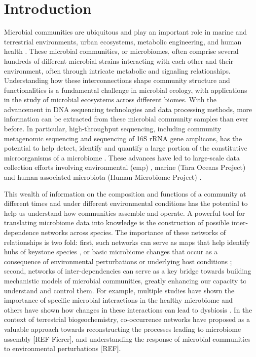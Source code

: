 
\section*{Introduction}

  Microbial communities are ubiquitous and play an important role in marine and terrestrial environments, urban ecosystems, metabolic engineering, and human health \cite{Ghoul2016,Thompson2017}.
  These microbial communities, or microbiomes, often comprise several hundreds of different microbial strains interacting with each other and their environment, often through intricate metabolic and signaling relationships.
  Understanding how these interconnections shape community structure and functionalities is a fundamental challenge in microbial ecology, with applications in the study of microbial ecosystems across different biomes. 
  With the advancement in DNA sequencing technologies \cite{Narihiro2017} and data processing methods,  more information can be extracted from these microbial community samples than ever before.
  In particular, high-throughput sequencing, including community metagenomic sequencing and sequencing of 16S rRNA gene amplicons, has the potential to help detect, identify and quantify a large portion of the constitutive microorganisms of a microbiome \cite{Jovel2016,Lloyd-Price2016}.
  These advances have led to large-scale data collection efforts involving environmental (\acl{emp}) \cite{Thompson2017}, marine (Tara Oceans Project) \cite{Zhang2015} and human-associated microbiota (Human Microbiome Project) \cite{HumanMicrobiomeProjectConsortium2012}.

 This wealth of information on the composition and functions of a community at different times and under different environmental conditions has the potential to help us understand how communities assemble and operate.
 A powerful tool for translating microbiome data into knowledge is the construction of possible inter-dependence networks across species.
 The importance of these networks of relationships is two fold: first, such networks can serve as maps that help identify hubs of keystone species \cite{Menon2018,Rottjers2018}, or basic microbiome changes that occur as a consequence of environmental perturbations or underlying host conditions \cite{Gilbert2016}; second, networks of inter-dependencies can serve as a key bridge towards building mechanistic models of microbial communities, greatly enhancing our capacity to understand and control them.
 For example, multiple studies have shown the importance of specific microbial interactions in the healthy microbiome \cite{Lloyd-Price2016} and others have shown how changes in these interactions can lead to dysbiosis \cite{Wang2017,Gilbert2016,Belizario2015}.
 In the context of terrestrial biogeochemistry, co-occurrence networks have proposed as a valuable approach towards reconstructing the processes leading to microbiome assembly [REF Fierer], and understanding the response of microbial communities to environmental perturbations [REF].

